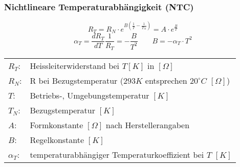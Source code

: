 \subsubsection{Nichtlineare Temperaturabhängigkeit (NTC)}
\[ R_T = R_N \cdot e^{B\left(\frac{1}{T} - \frac{1}{T_N}\right)} 
= A \cdot e^{\frac{B}{T}} \]
\[ \alpha_T = \frac{d R_T}{d T}\frac{1}{R_T} = -\frac{B}{T^2} 
\qquad B = -\alpha_T \cdot T^2 \]
\begin{tabular}{@{}lp{}}
  $R_T$:        & Heissleiterwiderstand bei $T[K]$ in $[\Omega]$ \\
  $R_N$:        & R bei Bezugstemperatur 
                  ($293 K$ entsprechen $20^\circ C$ $[\Omega]$) \\
  $T$:          & Betriebs-, Umgebungstemperatur $[K]$ \\
  $T_N$:        & Bezugstemperatur $[K]$ \\
  $A$:          & Formkonstante $[\Omega]$ nach Herstellerangaben \\
  $B$:          & Regelkonstante $[K]$ \\
  $\alpha_T$:   & temperaturabhängiger Temperaturkoeffizient bei $T$ $[K]$
\end{tabular}